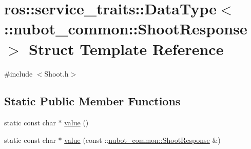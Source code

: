 \hypertarget{structros_1_1service__traits_1_1DataType_3_01_1_1nubot__common_1_1ShootResponse_01_4}{\section{ros\-:\-:service\-\_\-traits\-:\-:Data\-Type$<$ \-:\-:nubot\-\_\-common\-:\-:Shoot\-Response $>$ Struct Template Reference}
\label{structros_1_1service__traits_1_1DataType_3_01_1_1nubot__common_1_1ShootResponse_01_4}
}


{\ttfamily \#include $<$Shoot.\-h$>$}

\subsection*{Static Public Member Functions}
\begin{DoxyCompactItemize}
\item 
static const char $\ast$ \hyperlink{structros_1_1service__traits_1_1DataType_3_01_1_1nubot__common_1_1ShootResponse_01_4_ae4be57afd5579dfe306f6bcec25c1784}{value} ()
\item 
static const char $\ast$ \hyperlink{structros_1_1service__traits_1_1DataType_3_01_1_1nubot__common_1_1ShootResponse_01_4_a36681cd1c143749048dc7a12a0c2bca8}{value} (const \-::\hyperlink{namespacenubot__common_a7fc7346cebf4ea3bdbc7c25438d3959e}{nubot\-\_\-common\-::\-Shoot\-Response} \&)
\end{DoxyCompactItemize}


